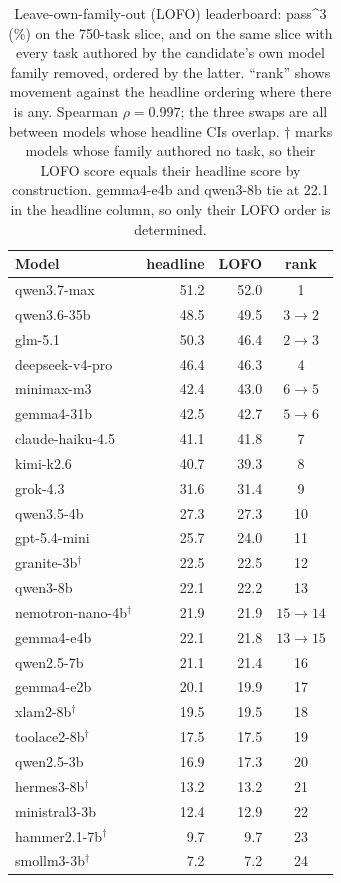 \begin{table}[t]
  \centering \small
  \begin{tabular}{lrrc}
    \toprule
    Model & headline & LOFO & rank \\
    \midrule
    qwen3.7-max & 51.2 & 52.0 & 1 \\
    qwen3.6-35b & 48.5 & 49.5 & $3 \to 2$ \\
    glm-5.1 & 50.3 & 46.4 & $2 \to 3$ \\
    deepseek-v4-pro & 46.4 & 46.3 & 4 \\
    minimax-m3 & 42.4 & 43.0 & $6 \to 5$ \\
    gemma4-31b & 42.5 & 42.7 & $5 \to 6$ \\
    claude-haiku-4.5 & 41.1 & 41.8 & 7 \\
    kimi-k2.6 & 40.7 & 39.3 & 8 \\
    grok-4.3 & 31.6 & 31.4 & 9 \\
    qwen3.5-4b & 27.3 & 27.3 & 10 \\
    gpt-5.4-mini & 25.7 & 24.0 & 11 \\
    granite-3b$^{\dagger}$ & 22.5 & 22.5 & 12 \\
    qwen3-8b & 22.1 & 22.2 & 13 \\
    nemotron-nano-4b$^{\dagger}$ & 21.9 & 21.9 & $15 \to 14$ \\
    gemma4-e4b & 22.1 & 21.8 & $13 \to 15$ \\
    qwen2.5-7b & 21.1 & 21.4 & 16 \\
    gemma4-e2b & 20.1 & 19.9 & 17 \\
    xlam2-8b$^{\dagger}$ & 19.5 & 19.5 & 18 \\
    toolace2-8b$^{\dagger}$ & 17.5 & 17.5 & 19 \\
    qwen2.5-3b & 16.9 & 17.3 & 20 \\
    hermes3-8b$^{\dagger}$ & 13.2 & 13.2 & 21 \\
    ministral3-3b & 12.4 & 12.9 & 22 \\
    hammer2.1-7b$^{\dagger}$ & 9.7 & 9.7 & 23 \\
    smollm3-3b$^{\dagger}$ & 7.2 & 7.2 & 24 \\
    \bottomrule
  \end{tabular}
  \caption{Leave-own-family-out (LOFO) leaderboard: pass\textasciicircum{}3
    (\%) on the 750-task slice, and on the same slice with every task authored
    by the candidate's own model family removed, ordered by the latter.
    ``rank'' shows movement against the headline ordering where there is any.
    Spearman \(\rho = 0.997\); the three swaps are all between models whose
    headline CIs overlap. \(\dagger\) marks models whose family authored no
    task, so their LOFO score equals their headline score by construction.
    gemma4-e4b and qwen3-8b tie at 22.1 in the headline column, so only their
    LOFO order is determined.}
  \label{tab:lofo}
\end{table}

